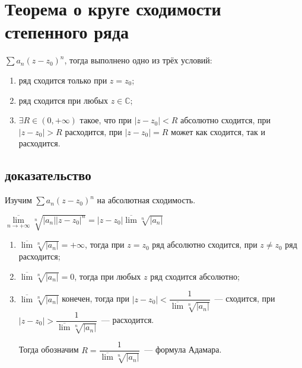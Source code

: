 \documentclass{article}
\begin{document}
    \newpage
    
    \section{Теорема о круге сходимости степенного ряда}
    
        $\sum a_n (z - z_0)^n$, тогда выполнено одно из трёх условий:
        
        \begin{enumerate}
        
            \item ряд сходится только при $z = z_0$;
            
            \item ряд сходится при любых $z \in \mathbb{C}$;
            
            \item $\exists R \in (0, +\infty)$ такое, что при $|z - z_0| < R$ абсолютно сходится, при $|z - z_0| > R$ расходится, при $|z - z_0| = R$ может как сходится, так и расходится.
            
        \end{enumerate}
        
        \subsection{доказательство}
        
            Изучим $\sum a_n (z - z_0)^n$ на абсолютная сходимость.
            
            $\overline{\lim\limits_{n \rightarrow +\infty}} \sqrt[n]{|a_n||z - z_0|^n} = |z - z_0| \overline{\lim} \sqrt[n]{|a_n|}$
            
            \begin{enumerate}
            
                \item $\overline{\lim} \sqrt[n]{|a_n|} = +\infty$, тогда при $z = z_0$ ряд абсолютно сходится, при $z \neq z_0$ ряд расходится;
                
                \item $\overline{\lim} \sqrt[n]{|a_n|} = 0$, тогда при любых $z$ ряд сходится абсолютно;
                
                \item $\overline{\lim} \sqrt[n]{|a_n|}$ конечен, тогда при $|z - z_0| < \dfrac{1}{\overline{\lim}\sqrt[n]{|a_n|}}$~--- сходится, при $|z - z_0| > \dfrac{1}{\overline{\lim}\sqrt[n]{|a_n|}}$~--- расходится.
                
                    Тогда обозначим $R = \dfrac{1}{\overline{\lim}\sqrt[n]{|a_n|}}$~--- формула Адамара.
                
            \end{enumerate}
            
\end{document}
